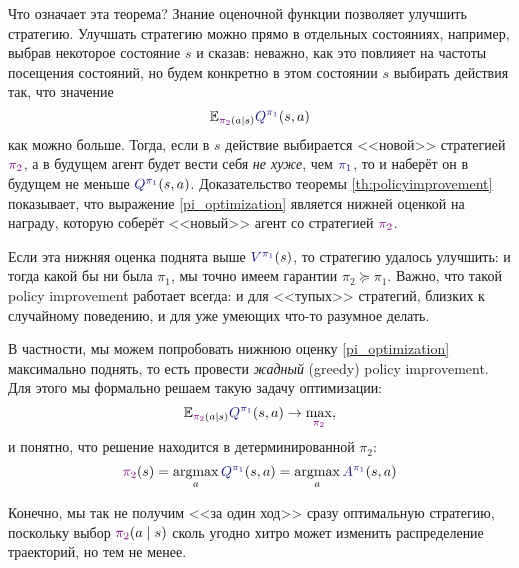 Что означает эта теорема? Знание оценочной функции позволяет улучшить стратегию. Улучшать стратегию можно прямо в отдельных состояниях, например, выбрав некоторое состояние $s$ и сказав: неважно, как это повлияет на частоты посещения состояний, но будем конкретно в этом состоянии $s$ выбирать действия так, что значение
\begin{equation}\label{pi_optimization}
\E_{\textcolor{ChadPurple}{\pi_2}(a \mid s)} \textcolor{ChadBlue}{Q^{\pi_1}}(s, a)    
\end{equation}
как можно больше. Тогда, если в $s$ действие выбирается <<новой>> стратегией $\textcolor{ChadPurple}{\pi_2}$, а в будущем агент будет вести себя \textit{не хуже}, чем $\textcolor{ChadBlue}{\pi_1}$, то и наберёт он в будущем не меньше $\textcolor{ChadBlue}{Q^{\pi_1}}(s, a)$. Доказательство теоремы \ref{th:policyimprovement} показывает, что выражение \eqref{pi_optimization} является нижней оценкой на награду, которую соберёт <<новый>> агент со стратегией $\textcolor{ChadPurple}{\pi_2}$. 

Если эта нижняя оценка поднята выше $\textcolor{ChadBlue}{V^{\pi_1}}(s)$, то стратегию удалось улучшить: и тогда какой бы ни была $\pi_1$, мы точно имеем гарантии $\pi_2 \succeq \pi_1$. Важно, что такой policy improvement работает всегда: и для <<тупых>> стратегий, близких к случайному поведению, и для уже умеющих что-то разумное делать.

В частности, мы можем попробовать нижнюю оценку \eqref{pi_optimization} максимально поднять, то есть провести \emph{жадный} (greedy) policy improvement. Для этого мы формально решаем такую задачу оптимизации:
$$
\E_{\textcolor{ChadPurple}{\pi_2}(a \mid s)} \textcolor{ChadBlue}{Q^{\pi_1}}(s, a) \to \max_{\textcolor{ChadPurple}{\pi_2}},
$$
и понятно, что решение находится в детерминированной $\pi_2$:
$$\textcolor{ChadPurple}{\pi_2}(s) = \argmax_{a} \textcolor{ChadBlue}{Q^{\pi_1}}(s, a)= \argmax_{a} \textcolor{ChadBlue}{A^{\pi_1}}(s, a)$$


Конечно, мы так не получим <<за один ход>> сразу оптимальную стратегию, поскольку выбор $\textcolor{ChadPurple}{\pi_2}(a \mid s)$ сколь угодно хитро может изменить распределение траекторий, но тем не менее.

